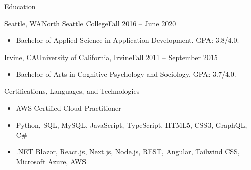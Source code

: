 \documentclass[]{mcdowellcv}
\begin{document}
	\begin{cvsection}{Education}
		\begin{cvsubsection}{Seattle, WA}{North Seattle College}{Fall 2016 -- June 2020}
			\begin{itemize}
				\item Bachelor of Applied Science in Application Development. GPA: 3.8/4.0.
			\end{itemize}
		\end{cvsubsection}
		\begin{cvsubsection}{Irvine, CA}{University of California, Irvine}{Fall 2011 -- September 2015}
			\begin{itemize}
				\item Bachelor of Arts in Cognitive Psychology and Sociology. GPA: 3.7/4.0.
			\end{itemize}
		\end{cvsubsection}
	\end{cvsection}
	
	\begin{cvsection}{Certifications, Languages, and Technologies}
		\begin{cvsubsection}{}{}{}	
			\begin{itemize}
				\item AWS Certified Cloud Practitioner
				\item Python, SQL, MySQL, JavaScript, TypeScript, HTML5, CSS3, GraphQL, C\#
				\item .NET Blazor, React.js, Next.js, Node.js, REST, Angular, Tailwind CSS, Microsoft Azure, AWS
			\end{itemize}
		\end{cvsubsection}
	\end{cvsection}
	
\end{document}
